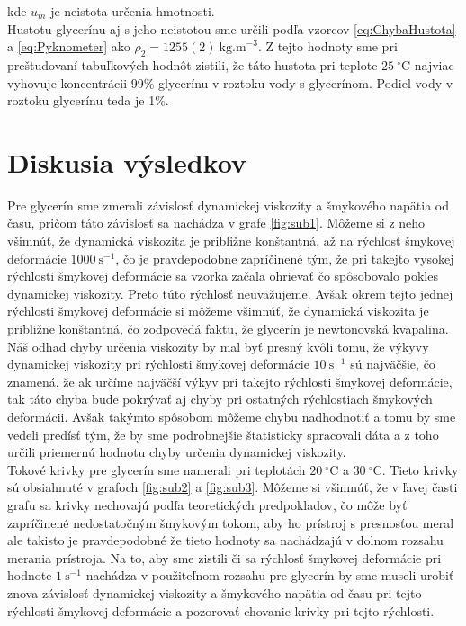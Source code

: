 \documentclass{prepareprotokol} %
\begin{document}
kde $u_m$ je neistota určenia hmotnosti.\\

Hustotu glycerínu aj s jeho neistotou sme určili podľa vzorcov \ref{eq:ChybaHustota} a \ref{eq:Pyknometer} ako $\rho_2 = 1255(2)~\mathrm{kg.m}^{-3}$. 
Z tejto hodnoty sme pri preštudovaní tabuľkových hodnôt \cite{Koncentrácia} zistili, že táto hustota pri teplote $25~^\circ \mathrm{C}$ najviac vyhovuje koncentrácii 99\% glycerínu v roztoku vody s glycerínom. 
Podiel vody v roztoku glycerínu teda je 1\%.

\newpage
\section*{Diskusia výsledkov}

Pre glycerín sme zmerali závislosť dynamickej viskozity a šmykového napätia od času, pričom táto závislosť sa nachádza v grafe \ref{fig:sub1}. 
Môžeme si z neho všimnúť, že dynamická viskozita je približne konštantná, až na rýchlosť šmykovej deformácie $1000~\mathrm{s}^{-1}$, čo je pravdepodobne zapríčinené tým, že pri takejto vysokej rýchlosti šmykovej deformácie sa vzorka začala ohrievať čo spôsobovalo pokles dynamickej viskozity. 
Preto túto rýchlosť neuvažujeme. 
Avšak okrem tejto jednej rýchlosti šmykovej deformácie si môžeme všimnúť, že dynamická viskozita je približne konštantná, čo zodpovedá faktu, že glycerín je newtonovská kvapalina.\\

Náš odhad chyby určenia viskozity by mal byť presný kvôli tomu, že výkyvy dynamickej viskozity pri rýchlosti šmykovej deformácie $10~\mathrm{s}^{-1}$ sú najväčšie, čo znamená, že ak určíme najväčší výkyv pri takejto rýchlosti šmykovej deformácie, tak táto chyba bude pokrývať aj chyby pri ostatných rýchlostiach šmykových deformácii. 
Avšak takýmto spôsobom môžeme chybu nadhodnotiť a tomu by sme vedeli predísť tým, že by sme podrobnejšie štatisticky spracovali dáta a z toho určili priemernú hodnotu chyby určenia dynamickej viskozity.\\

Tokové krivky pre glycerín sme namerali pri teplotách $20~^\circ \mathrm{C}$ a $30~^\circ \mathrm{C}$. 
Tieto krivky sú obsiahnuté v grafoch \ref{fig:sub2} a \ref{fig:sub3}.
Môžeme si všimnúť, že v ľavej časti grafu sa krivky nechovajú podľa teoretických predpokladov, čo môže byť zapríčinené nedostatočným šmykovým tokom, aby ho prístroj s presnosťou meral ale takisto je pravdepodobné že tieto hodnoty sa nachádzajú v dolnom rozsahu merania prístroja.
Na to, aby sme zistili či sa rýchlosť šmykovej deformácie pri hodnote $1~\mathrm{s}^{-1}$ nachádza v použiteľnom rozsahu pre glycerín by sme museli urobiť znova závislosť dynamickej viskozity a šmykového napätia od času pri tejto rýchlosti šmykovej deformácie a pozorovať chovanie krivky pri tejto rýchlosti.\\
\end{document}

